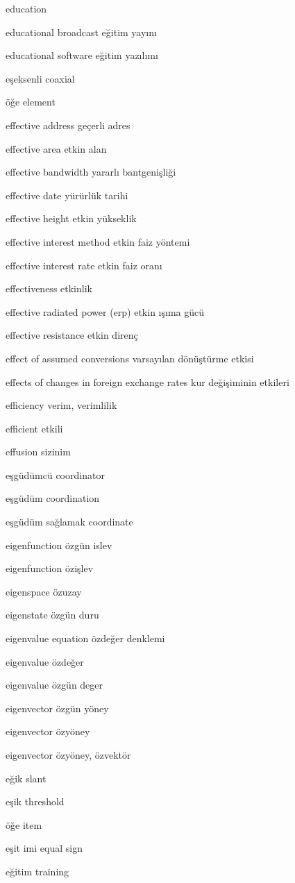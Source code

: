 \documentclass[12pt,fleqn]{article}\usepackage{../../common}
\begin{document}
education

educational broadcast eğitim yayını

educational software eğitim yazılımı

eşeksenli coaxial

öğe element

effective address geçerli adres

effective area etkin alan

effective bandwidth yararlı bantgenişliği

effective date yürürlük tarihi

effective height etkin yükseklik

effective interest method etkin faiz yöntemi

effective interest rate etkin faiz oranı

effectiveness etkinlik

effective radiated power (erp) etkin ışıma gücü

effective resistance etkin direnç

effect of assumed conversions varsayılan dönüştürme etkisi

effects of changes in foreign exchange rates kur değişiminin etkileri

efficiency verim, verimlilik

efficient etkili

effusion sizinim

eşgüdümcü coordinator

eşgüdüm coordination

eşgüdüm sağlamak coordinate

eigenfunction özgün islev

eigenfunction özişlev

eigenspace özuzay

eigenstate özgün duru

eigenvalue equation özdeğer denklemi

eigenvalue özdeğer

eigenvalue özgün deger

eigenvector özgün yöney

eigenvector özyöney

eigenvector özyöney, özvektör

eğik slant

eşik threshold

öğe item

eşit imi equal sign

eğitim training
\end{document}
